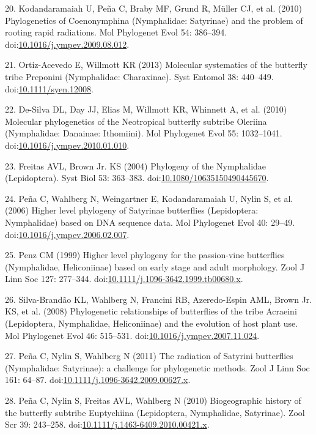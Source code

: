 \documentclass[10pt]{article}
\begin{document}
20. Kodandaramaiah U, Pe\~na C, Braby MF, Grund R, M\"uller CJ, et al.
(2010) Phylogenetics of Coenonymphina (Nymphalidae: Satyrinae) and the
problem of rooting rapid radiations. Mol Phylogenet Evol 54: 386--394.
doi:\href{http://dx.doi.org/10.1016/j.ympev.2009.08.012}{10.1016/j.ympev.2009.08.012}.

21. Ortiz-Acevedo E, Willmott KR (2013) Molecular systematics of the
butterfly tribe Preponini (Nymphalidae: Charaxinae). Syst Entomol 38:
440--449.
doi:\href{http://dx.doi.org/10.1111/syen.12008}{10.1111/syen.12008}.

22. De-Silva DL, Day JJ, Elias M, Willmott KR, Whinnett A, et al. (2010)
Molecular phylogenetics of the Neotropical butterfly subtribe Oleriina
(Nymphalidae: Danainae: Ithomiini). Mol Phylogenet Evol 55: 1032--1041.
doi:\href{http://dx.doi.org/10.1016/j.ympev.2010.01.010}{10.1016/j.ympev.2010.01.010}.

23. Freitas AVL, Brown Jr. KS (2004) Phylogeny of the Nymphalidae
(Lepidoptera). Syst Biol 53: 363--383.
doi:\href{http://dx.doi.org/10.1080/10635150490445670}{10.1080/10635150490445670}.

24. Pe\~na C, Wahlberg N, Weingartner E, Kodandaramaiah U, Nylin S, et al.
(2006) Higher level phylogeny of Satyrinae butterflies (Lepidoptera:
Nymphalidae) based on DNA sequence data. Mol Phylogenet Evol 40: 29--49.
doi:\href{http://dx.doi.org/10.1016/j.ympev.2006.02.007}{10.1016/j.ympev.2006.02.007}.

25. Penz CM (1999) Higher level phylogeny for the passion-vine
butterflies (Nymphalidae, Heliconiinae) based on early stage and adult
morphology. Zool J Linn Soc 127: 277--344.
doi:\href{http://dx.doi.org/10.1111/j.1096-3642.1999.tb00680.x}{10.1111/j.1096-3642.1999.tb00680.x}.

26. Silva-Brand\~ao KL, Wahlberg N, Francini RB, Azeredo-Espin AML, Brown
Jr. KS, et al. (2008) Phylogenetic relationships of butterflies of the
tribe Acraeini (Lepidoptera, Nymphalidae, Heliconiinae) and the
evolution of host plant use. Mol Phylogenet Evol 46: 515--531.
doi:\href{http://dx.doi.org/10.1016/j.ympev.2007.11.024}{10.1016/j.ympev.2007.11.024}.

27. Pe\~na C, Nylin S, Wahlberg N (2011) The radiation of Satyrini
butterflies (Nymphalidae: Satyrinae): a challenge for phylogenetic
methods. Zool J Linn Soc 161: 64--87.
doi:\href{http://dx.doi.org/10.1111/j.1096-3642.2009.00627.x}{10.1111/j.1096-3642.2009.00627.x}.

28. Pe\~na C, Nylin S, Freitas AVL, Wahlberg N (2010) Biogeographic
history of the butterfly subtribe Euptychiina (Lepidoptera, Nymphalidae,
Satyrinae). Zool Scr 39: 243--258.
doi:\href{http://dx.doi.org/10.1111/j.1463-6409.2010.00421.x}{10.1111/j.1463-6409.2010.00421.x}.
\end{document}
